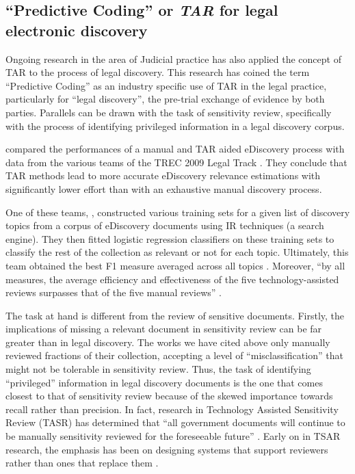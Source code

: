 \documentclass[\version]{l4proj}
\begin{document}
\subsection{``Predictive Coding'' or \textit{TAR} for legal electronic discovery}

Ongoing research in the area of Judicial practice has also applied the concept of TAR to the process of legal discovery.
This research has coined the term ``Predictive Coding'' \autocite{carrollGrossmancormackGlossaryTechnologyassisted2013} as an industry specific use of TAR in the legal practice, particularly for ``legal discovery'', the pre-trial exchange of evidence by both parties.
Parallels can be drawn with the task of sensitivity review, specifically with the process of identifying privileged information in a legal discovery corpus.

\textcite{grossmanTechnologyAssistedReviewEDiscovery2010} compared the performances of a manual and TAR aided eDiscovery process with data from the various teams of the TREC 2009 Legal Track \autocite{hedinOverviewTREC2009}.
They conclude that TAR methods lead to more accurate eDiscovery relevance estimations with significantly lower effort than with an exhaustive manual discovery process.

One of these teams, \textcite{cormackMachineLearningInformation2009}, constructed various training sets for a given list of discovery topics from a corpus of eDiscovery documents using IR techniques (a search engine).
They then fitted logistic regression classifiers on these training sets to classify the rest of the collection as relevant or not for each topic.
Ultimately, this team obtained the best F1 measure averaged across all topics \autocite{hedinOverviewTREC2009}.
Moreover, ``by all measures, the average efficiency and effectiveness of the five technology-assisted reviews surpasses that of the five manual reviews'' \autocite[p.~43]{grossmanTechnologyAssistedReviewEDiscovery2010}.

The task at hand is different from the review of sensitive documents.
Firstly, the implications of missing a relevant document in sensitivity review can be far greater than in legal discovery.
The works we have cited above only manually reviewed fractions of their collection, accepting a level of ``misclassification'' that might not be tolerable in sensitivity review.
Thus, the task of identifying ``privileged'' information in legal discovery documents is the one that comes closest to that of sensitivity review \autocite{berardiSemiAutomatedTextClassification2015} because of the skewed importance towards recall rather than precision.
In fact, research in Technology Assisted Sensitivity Review (TASR) has determined that ``all government documents will continue to be manually sensitivity reviewed for the foreseeable future'' \autocite[1]{mcdonaldHowSensitivityClassification2019}.
Early on in TSAR research, the emphasis has been on designing systems that support reviewers rather than ones that replace them \autocite{mcdonaldClassifierDigitalSensitivity2014}.
\end{document}
